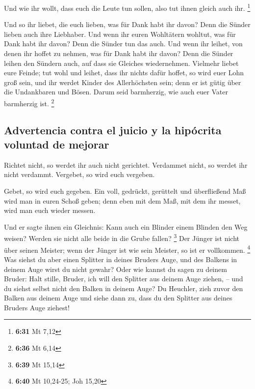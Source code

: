  Und wie ihr wollt, dass euch die Leute tun sollen, also
tut ihnen gleich auch ihr. \footnote{\textbf{6:31} Mt 7,12}

 Und so ihr liebet, die euch lieben, was für Dank habt
ihr davon? Denn die Sünder lieben auch ihre Liebhaber. 
Und wenn ihr euren Wohltätern wohltut, was für Dank habt ihr davon? Denn
die Sünder tun das auch.  Und wenn ihr leihet, von denen
ihr hoffet zu nehmen, was für Dank habt ihr davon? Denn die Sünder
leihen den Sündern auch, auf dass sie Gleiches wiedernehmen.
 Vielmehr liebet eure Feinde; tut wohl und leihet, dass
ihr nichts dafür hoffet, so wird euer Lohn groß sein, und ihr werdet
Kinder des Allerhöchsten sein; denn er ist gütig über die Undankbaren
und Bösen.  Darum seid barmherzig, wie auch euer Vater
barmherzig ist. \footnote{\textbf{6:36} Mt 6,14}

\hypertarget{advertencia-contra-el-juicio-y-la-hipuxf3crita-voluntad-de-mejorar}{%
\subsection{Advertencia contra el juicio y la hipócrita voluntad de
mejorar}\label{advertencia-contra-el-juicio-y-la-hipuxf3crita-voluntad-de-mejorar}}

 Richtet nicht, so werdet ihr auch nicht gerichtet.
Verdammet nicht, so werdet ihr nicht verdammt. Vergebet, so wird euch
vergeben.

 Gebet, so wird euch gegeben. Ein voll, gedrückt,
gerüttelt und überfließend Maß wird man in euren Schoß geben; denn eben
mit dem Maß, mit dem ihr messet, wird man euch wieder messen.

 Und er sagte ihnen ein Gleichnis: Kann auch ein Blinder
einem Blinden den Weg weisen? Werden sie nicht alle beide in die Grube
fallen? \footnote{\textbf{6:39} Mt 15,14}  Der Jünger ist
nicht über seinen Meister; wenn der Jünger ist wie sein Meister, so ist
er vollkommen. \footnote{\textbf{6:40} Mt 10,24-25; Joh 15,20}
 Was siehst du aber einen Splitter in deines Bruders
Auge, und des Balkens in deinem Auge wirst du nicht gewahr?
 Oder wie kannst du sagen zu deinem Bruder: Halt stille,
Bruder, ich will den Splitter aus deinem Auge ziehen, -- und du siehst
selbst nicht den Balken in deinem Auge? Du Heuchler, zieh zuvor den
Balken aus deinem Auge und siehe dann zu, dass du den Splitter aus
deines Bruders Auge ziehest!

